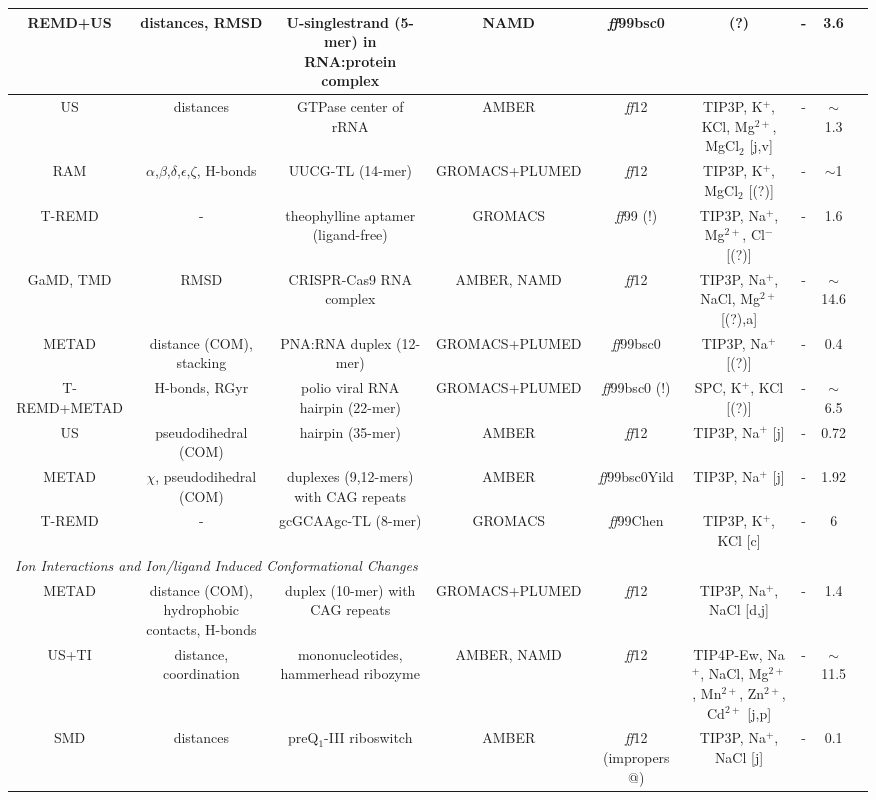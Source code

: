 \begin{tabular}{ccccccccc}
\midrule 
REMD+US & distances, RMSD & U-singlestrand (5-mer) in RNA:protein complex & NAMD & \emph{ff}99bsc0 & (?) & - & 3.6 & \cite{vukovic2016molecular}\tabularnewline
\midrule 
US & distances & GTPase center of rRNA & AMBER & \emph{ff}12 & TIP3P, K$^{+}$, KCl, Mg$^{2+}$, MgCl$_{2}$ {[}j,v{]} & - & $\sim$1.3 & \cite{hayatshahi2017investigating}\tabularnewline
\midrule
RAM & $\alpha$,$\beta$,$\delta$,$\epsilon$,$\zeta$, H-bonds  & UUCG-TL (14-mer) & GROMACS+PLUMED & \emph{ff}12 & TIP3P, K$^{+}$, MgCl$_{2}$ {[}(?){]} & - & $\sim$1 & \cite{borkar2017simultaneous}\tabularnewline
\midrule
T-REMD & - & theophylline aptamer (ligand-free) & GROMACS & \emph{ff}99 (!) & TIP3P, Na$^{+}$, Mg$^{2+}$, Cl$^{-}$ {[}(?){]} & - & 1.6 & \cite{warfield2017molecular}\tabularnewline
\midrule 
GaMD, TMD & RMSD & CRISPR-Cas9 RNA complex & AMBER, NAMD & \emph{ff}12 & TIP3P, Na$^{+}$, NaCl, Mg$^{2+}$ {[}(?),a{]} & - & $\sim$14.6 & \cite{palermo2017crispr}\tabularnewline
\midrule
METAD & distance (COM), stacking & PNA:RNA duplex (12-mer) & GROMACS+PLUMED & \emph{ff}99bsc0 & TIP3P, Na$^{+}$ {[}(?){]} & - & 0.4 & \cite{verona2017focus}\tabularnewline
\midrule
T-REMD+METAD & H-bonds, RGyr & polio viral RNA hairpin (22-mer) & GROMACS+PLUMED & \emph{ff}99bsc0 (!) & SPC, K$^{+}$, KCl {[}(?){]} & - & $\sim$6.5 & \cite{pathak2017water}\tabularnewline
\midrule
US & pseudodihedral (COM) & hairpin (35-mer) & AMBER & \emph{ff}12 & TIP3P, Na$^{+}$ {[}j{]} & - & 0.72 & \cite{sun2017protonation}\tabularnewline
\midrule 
METAD & $\chi$, pseudodihedral (COM) & duplexes (9,12-mers) with CAG repeats & AMBER & \emph{ff}99bsc0Yild & TIP3P, Na$^{+}$ {[}j{]} & - & 1.92 & \cite{pan2017structure}\tabularnewline
\midrule
T-REMD & - & gcGCAAgc-TL (8-mer) & GROMACS & \emph{ff}99Chen & TIP3P, K$^{+}$, KCl {[}c{]} & - & 6 & \cite{miner2017equilibrium}\tabularnewline
\midrule
\multicolumn{9}{l}{\emph{Ion Interactions and Ion/ligand Induced Conformational Changes}}\tabularnewline
\midrule 
METAD & distance (COM), hydrophobic contacts, H-bonds & duplex (10-mer) with CAG repeats  & GROMACS+PLUMED & \emph{ff}12 & TIP3P, Na$^{+}$, NaCl {[}d,j{]} & - & 1.4 & \cite{bochicchio2015molecular}\tabularnewline
\midrule
US+TI & distance, coordination & mononucleotides, hammerhead ribozyme & AMBER, NAMD & \emph{ff}12 & TIP4P-Ew, Na$^{+}$, NaCl, Mg$^{2+}$, Mn$^{2+}$, Zn$^{2+}$, Cd$^{2+}$ {[}j,p{]} & - & $\sim$11.5 & \cite{panteva2015comparison}\tabularnewline
\midrule 
SMD & distances & preQ$_{1}$-III riboswitch & AMBER & \emph{ff}12 (impropers @) & TIP3P, Na$^{+}$, NaCl {[}j{]} & - & 0.1 & \cite{liberman2015structural}\tabularnewline

\end{tabular}
